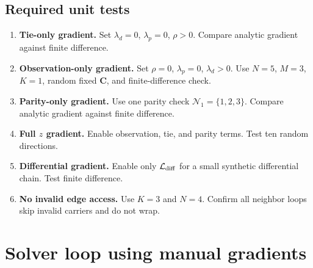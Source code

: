 \documentclass[11pt]{article}
\begin{document}
\subsection{Required unit tests}

\begin{enumerate}[label=\textbf{G\arabic*.},leftmargin=*]
\item \textbf{Tie-only gradient.}  Set $\lambda_d=0$, $\lambda_p=0$, $\rho>0$.  Compare analytic gradient against finite difference.
\item \textbf{Observation-only gradient.}  Set $\rho=0$, $\lambda_p=0$, $\lambda_d>0$.  Use $N=5$, $M=3$, $K=1$, random fixed $\mathbf C$, and finite-difference check.
\item \textbf{Parity-only gradient.}  Use one parity check $\mathcal N_1=\{1,2,3\}$.  Compare analytic gradient against finite difference.
\item \textbf{Full $z$ gradient.}  Enable observation, tie, and parity terms.  Test ten random directions.
\item \textbf{Differential gradient.}  Enable only $\mathcal L_{\rm diff}$ for a small synthetic differential chain.  Test finite difference.
\item \textbf{No invalid edge access.}  Use $K=3$ and $N=4$.  Confirm all neighbor loops skip invalid carriers and do not wrap.
\end{enumerate}

\section{Solver loop using manual gradients}
\end{document}
